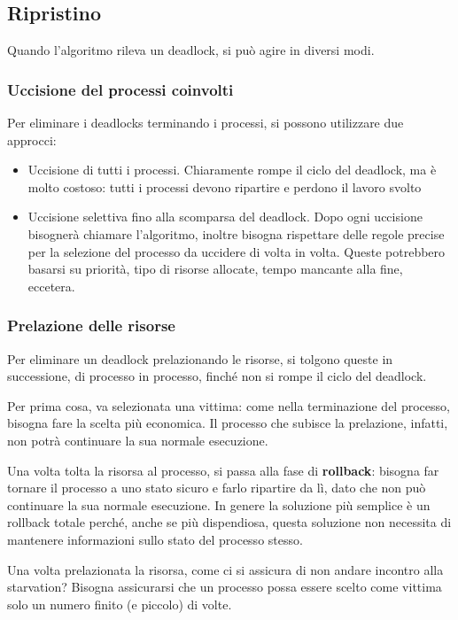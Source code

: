 \documentclass[a4paper]{article}
\begin{document}
\subsection{Ripristino}
Quando l'algoritmo rileva un deadlock, si può agire in diversi modi.
\subsubsection{Uccisione del processi coinvolti}
Per eliminare i deadlocks terminando i processi, si possono utilizzare due approcci:
\begin{itemize}
   \item Uccisione di tutti i processi. Chiaramente rompe il ciclo del deadlock, ma è molto costoso: tutti i processi devono ripartire e perdono il lavoro svolto
   \item Uccisione selettiva fino alla scomparsa del deadlock. Dopo ogni uccisione bisognerà chiamare l'algoritmo, inoltre bisogna rispettare delle regole precise per la selezione del processo da uccidere di volta in volta. Queste potrebbero basarsi su priorità, tipo di risorse allocate, tempo mancante  alla fine, eccetera.
\end{itemize}

\subsubsection{Prelazione delle risorse}
Per eliminare un deadlock prelazionando le risorse, si tolgono queste in successione, di processo in processo, finché non si rompe il ciclo del deadlock.

Per prima cosa, va selezionata una vittima: come nella terminazione del processo, bisogna fare la scelta più economica. Il processo che subisce la prelazione, infatti, non potrà continuare la sua normale esecuzione.

Una volta tolta la risorsa al processo, si passa alla fase di \textbf{rollback}: bisogna far tornare il processo a uno stato sicuro e farlo ripartire da lì, dato che non può continuare la sua normale esecuzione. In genere la soluzione più semplice è un rollback totale perché, anche se più dispendiosa, questa soluzione non necessita di mantenere informazioni sullo stato del processo stesso.

Una volta prelazionata la risorsa, come ci si assicura di non andare incontro alla starvation? Bisogna assicurarsi che un processo possa essere scelto come vittima solo un numero finito (e piccolo) di volte.
\end{document}
